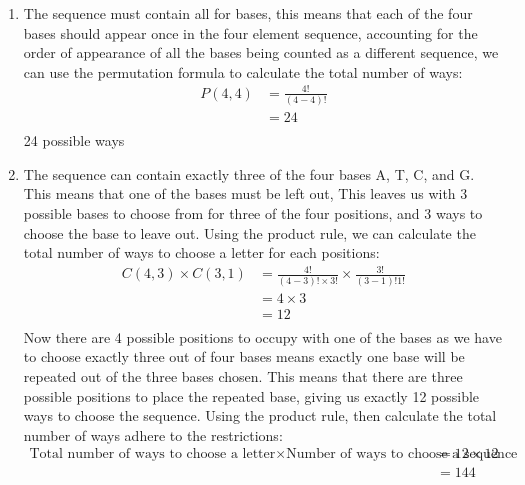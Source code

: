 \documentclass[12pt letter]{report}
\begin{document}
{\begin{enumerate}
          But the unit ACG can also fill the first three positions from the right, which again only leaves one
          position left, using sum rule, this result in the total number of ways being:
          \[
            4 + 4 = 8
          \]
          8 possible ways
    \item
          The sequence must contain all for bases, this means that each of the four bases should appear once in the
          four element sequence, accounting for the order of appearance of all the bases being counted as a different
          sequence, we can use the permutation formula to calculate the total number of ways:
          \begin{align*}
            P \left( 4, 4 \right) & = \frac{4!}{(4 - 4)!} \\
                                  & = 24                  \\
          \end{align*}
          24 possible ways
    \item The sequence can contain exactly three of the four bases A, T, C, and G. This means that one of the bases
          must be left out, This leaves us with 3 possible bases to choose from for three of the four positions, and 3
          ways to choose the base to leave out. Using the product rule, we can calculate the total number of ways to
          choose a letter for each positions:
          \begin{align*}
            C \left( 4, 3 \right) \times C \left( 3, 1 \right) & = \frac{4!}{(4 - 3)!\times 3!} \times \frac{3!}{\left(
            3 - 1\right)! 1! }                                                                                          \\
                                                               & = 4 \times 3                                           \\
                                                               & = 12                                                   \\
          \end{align*}
          Now there are 4 possible positions to occupy with one of the bases as we have to choose exactly three out of four
          bases means exactly one base will be repeated out of the three bases chosen. This means that there are three
          possible positions to place the repeated base, giving us exactly 12 possible ways to choose the sequence. Using
          the product rule, then calculate the total number of ways adhere to the restrictions:
          \begin{align*}
            \text{Total number of ways to choose a letter} \times  \text{Number of ways to choose a sequence} & = 12 \times 12 \\
                                                                                                              & = 144          \\
          \end{align*}


  \end{enumerate}

}
\end{document}
